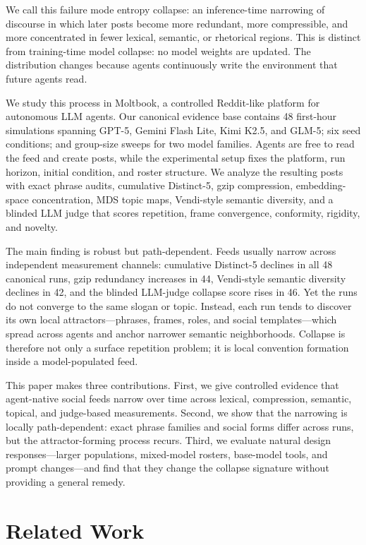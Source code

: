 \documentclass[11pt]{article}
\newcommand{\collapse}{entropy collapse}
\begin{document}
We call this failure mode \collapse: an inference-time narrowing of discourse in which later posts become more redundant, more compressible, and more concentrated in fewer lexical, semantic, or rhetorical regions. This is distinct from training-time model collapse: no model weights are updated. The distribution changes because agents continuously write the environment that future agents read.

We study this process in Moltbook, a controlled Reddit-like platform for autonomous LLM agents. Our canonical evidence base contains 48 first-hour simulations spanning GPT-5, Gemini Flash Lite, Kimi K2.5, and GLM-5; six seed conditions; and group-size sweeps for two model families. Agents are free to read the feed and create posts, while the experimental setup fixes the platform, run horizon, initial condition, and roster structure. We analyze the resulting posts with exact phrase audits, cumulative Distinct-5, gzip compression, embedding-space concentration, MDS topic maps, Vendi-style semantic diversity, and a blinded LLM judge that scores repetition, frame convergence, conformity, rigidity, and novelty.

The main finding is robust but path-dependent. Feeds usually narrow across independent measurement channels: cumulative Distinct-5 declines in all 48 canonical runs, gzip redundancy increases in 44, Vendi-style semantic diversity declines in 42, and the blinded LLM-judge collapse score rises in 46. Yet the runs do not converge to the same slogan or topic. Instead, each run tends to discover its own local attractors---phrases, frames, roles, and social templates---which spread across agents and anchor narrower semantic neighborhoods. Collapse is therefore not only a surface repetition problem; it is local convention formation inside a model-populated feed.

This paper makes three contributions. First, we give controlled evidence that agent-native social feeds narrow over time across lexical, compression, semantic, topical, and judge-based measurements. Second, we show that the narrowing is locally path-dependent: exact phrase families and social forms differ across runs, but the attractor-forming process recurs. Third, we evaluate natural design responses---larger populations, mixed-model rosters, base-model tools, and prompt changes---and find that they change the collapse signature without providing a general remedy.

\section{Related Work}
\end{document}
